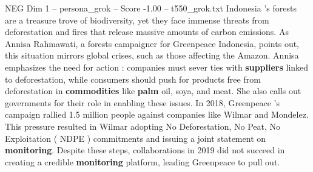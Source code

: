 \begin{textsample}{NEG Dim 1 – persona\_grok – Score -1.00 – t550\_grok.txt}  \label{ex:f1_neg_028}
Indonesia 's forests are a treasure trove of biodiversity, yet they face immense threats from deforestation and fires that release massive amounts of carbon emissions.
As Annisa Rahmawati, a forests campaigner for Greenpeace Indonesia, points out, this situation mirrors global crises, such as those affecting the Amazon.
Annisa emphasizes the need for action : companies must sever ties with \textbf{suppliers} linked to deforestation, while consumers should push for products free from deforestation in \textbf{commodities} like \textbf{palm} oil, soya, and meat.
She also calls out governments for their role in enabling these issues.
In 2018, Greenpeace 's campaign rallied 1.5 million people against companies like Wilmar and Mondelez.
This pressure resulted in Wilmar adopting No Deforestation, No Peat, No Exploitation ( NDPE ) commitments and issuing a joint statement on \textbf{monitoring}.
Despite these steps, collaborations in 2019 did not succeed in creating a credible \textbf{monitoring} platform, leading Greenpeace to pull out.

\end{textsample}
